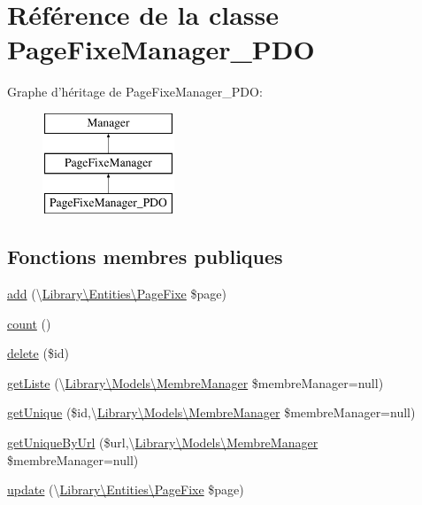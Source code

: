 \hypertarget{class_library_1_1_models_1_1_page_fixe_manager___p_d_o}{\section{Référence de la classe Page\+Fixe\+Manager\+\_\+\+P\+D\+O}
\label{class_library_1_1_models_1_1_page_fixe_manager___p_d_o}
}
Graphe d'héritage de Page\+Fixe\+Manager\+\_\+\+P\+D\+O\+:\begin{figure}[H]
\begin{center}
\leavevmode
\includegraphics[height=3.000000cm]{class_library_1_1_models_1_1_page_fixe_manager___p_d_o}
\end{center}
\end{figure}
\subsection*{Fonctions membres publiques}
\begin{DoxyCompactItemize}
\item 
\hyperlink{class_library_1_1_models_1_1_page_fixe_manager___p_d_o_aefbb84f33b85315f616c2616bef7f624}{add} (\textbackslash{}\hyperlink{class_library_1_1_entities_1_1_page_fixe}{Library\textbackslash{}\+Entities\textbackslash{}\+Page\+Fixe} \$page)
\item 
\hyperlink{class_library_1_1_models_1_1_page_fixe_manager___p_d_o_ac751e87b3d4c4bf2feb03bee8b092755}{count} ()
\item 
\hyperlink{class_library_1_1_models_1_1_page_fixe_manager___p_d_o_a2f8258add505482d7f00ea26493a5723}{delete} (\$id)
\item 
\hyperlink{class_library_1_1_models_1_1_page_fixe_manager___p_d_o_ab569f8e7e64b40e73bb4602d0100949a}{get\+Liste} (\textbackslash{}\hyperlink{class_library_1_1_models_1_1_membre_manager}{Library\textbackslash{}\+Models\textbackslash{}\+Membre\+Manager} \$membre\+Manager=null)
\item 
\hyperlink{class_library_1_1_models_1_1_page_fixe_manager___p_d_o_a6813dfac681bc517ce0a9608f48367f3}{get\+Unique} (\$id,\textbackslash{}\hyperlink{class_library_1_1_models_1_1_membre_manager}{Library\textbackslash{}\+Models\textbackslash{}\+Membre\+Manager} \$membre\+Manager=null)
\item 
\hyperlink{class_library_1_1_models_1_1_page_fixe_manager___p_d_o_af0e5053789c8ab10d26dff9390e9e3b1}{get\+Unique\+By\+Url} (\$url,\textbackslash{}\hyperlink{class_library_1_1_models_1_1_membre_manager}{Library\textbackslash{}\+Models\textbackslash{}\+Membre\+Manager} \$membre\+Manager=null)
\item 
\hyperlink{class_library_1_1_models_1_1_page_fixe_manager___p_d_o_a4b373084f63726addf406af3a14b3155}{update} (\textbackslash{}\hyperlink{class_library_1_1_entities_1_1_page_fixe}{Library\textbackslash{}\+Entities\textbackslash{}\+Page\+Fixe} \$page)
\end{DoxyCompactItemize}
